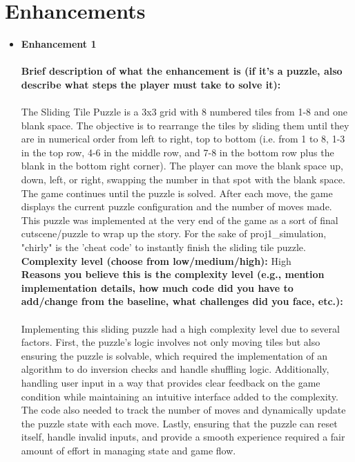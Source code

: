 \documentclass[11pt]{article}
\begin{document}
\section*{Enhancements}
\begin{itemize}
    \item \textbf{Enhancement 1} \\\\
       \textbf{ Brief description of what the enhancement is (if it's a puzzle, also describe what steps the player must take to solve it):\\\\}
        The Sliding Tile Puzzle is a 3x3 grid with 8 numbered tiles from 1-8 and one blank space. The objective is to rearrange the tiles by sliding them until they are in numerical order from left to right, top to bottom (i.e. from 1 to 8, 1-3 in the top row, 4-6 in the middle row, and 7-8 in the bottom row plus the blank in the bottom right corner). The player can move the blank space up, down, left, or right, swapping the number in that spot with the blank space. The game continues until the puzzle is solved. After each move, the game displays the current puzzle configuration and the number of moves made. This puzzle was implemented at the very end of the game as a sort of final cutscene/puzzle to wrap up the story. For the sake of proj1\_simulation, "chirly" is the 'cheat code' to instantly finish the sliding tile puzzle. \\

       \textbf{Complexity level (choose from low/medium/high):} High \\

       \textbf{ Reasons you believe this is the complexity level (e.g., mention implementation details, how much code did you have to add/change from the baseline, what challenges did you face, etc.):}\\\\
       Implementing this sliding puzzle had a high complexity level due to several factors. First, the puzzle’s logic involves not only moving tiles but also ensuring the puzzle is solvable, which required the implementation of an algorithm to do inversion checks and handle shuffling logic. Additionally, handling user input in a way that provides clear feedback on the game condition while maintaining an intuitive interface added to the complexity. The code also needed to track the number of moves and dynamically update the puzzle state with each move. Lastly, ensuring that the puzzle can reset itself, handle invalid inputs, and provide a smooth experience required a fair amount of effort in managing state and game flow.

\end{itemize}
\end{document}
